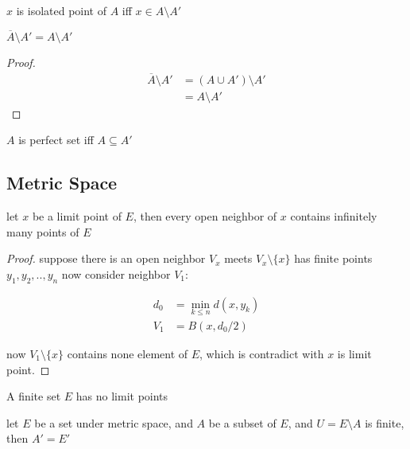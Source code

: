 \begin{definition}
    $x$ is isolated point of $A$ iff $x \in A \setminus A'$ 
\end{definition}

\begin{lem}
$\overline{A} \setminus A' = A \setminus A'$
\end{lem}
\begin{proof}
    \begin{align*}
        \overline{A} \setminus A' &= \left( A \cup A'\right) \setminus A' \\
        &=  A \setminus A'
    \end{align*}
\end{proof}

\begin{definition}
    $A$ is perfect set iff $A \subseteq A'$
\end{definition}

\subsection{Metric Space}

\begin{thm}
    \label{thm:2-2-1}
    let $x$ be a limit point of $E$, then every open neighbor of $x$
    contains infinitely many points of $E$
\end{thm}

\begin{proof}
    suppose there is an open neighbor $V_x$ meets $V_x \setminus \{ x \}$ has finite points $y_1,y_2,..,y_n$
    now consider neighbor $V_1$:

    \begin{align*}
        d_0 &= \min_{k \le n} d(x, y_k) \\
        V_1 &= B(x,d_0/2)
    \end{align*}

    now $V_1 \setminus \{ x \}$ contains none element of $E$, which is contradict with $x$ is limit point.
\end{proof}

\begin{corollary}
    A finite set $E$ has no limit points
\end{corollary}


\begin{corollary}
    \label{col:2-2-3}
    let $E$ be a set under metric space, and $A$ be a subset of $E$, and $U = E \setminus A$ is finite, then $A' = E'$
\end{corollary}

